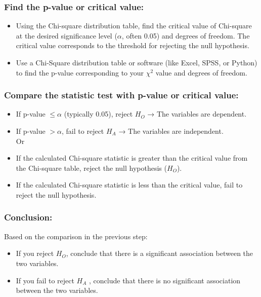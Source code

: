 \documentclass[12pt]{article}
\begin{document}
\subsubsection{Find the p-value or  critical value:}
\begin{itemize}
\item Using the Chi-square distribution table, find the critical value of Chi-square at the desired significance level ($\alpha$, often 0.05) and degrees of freedom. The critical value corresponds to the threshold for rejecting the null hypothesis.

\item Use a Chi-Square distribution table or software (like Excel, SPSS, or Python) to find the p-value corresponding to your $\chi^2$ value and degrees of freedom.
\end{itemize}

\subsubsection{Compare the statistic test with p-value or critical value:}
\begin{itemize}
\item If p-value $\leq\alpha$ (typically 0.05), reject $H_O$ → The variables are dependent.
\item If p-value $> \alpha$, fail to reject $H_A$ → The variables are independent.\\[6pt]
Or
\item If the calculated Chi-square statistic is greater than the critical value from the Chi-square table, reject the null hypothesis ($H_O$).
\item If the calculated Chi-square statistic is less than the critical value, fail to reject the null hypothesis.

\end{itemize}

\subsubsection{Conclusion:}
Based on the comparison in the previous step:
\begin{itemize}
\item If you reject $H_O$, conclude that there is a significant association between the two variables.
\item If you fail to reject $H_A$ , conclude that there is no significant association between the two variables.
\end{itemize}
\end{document}
